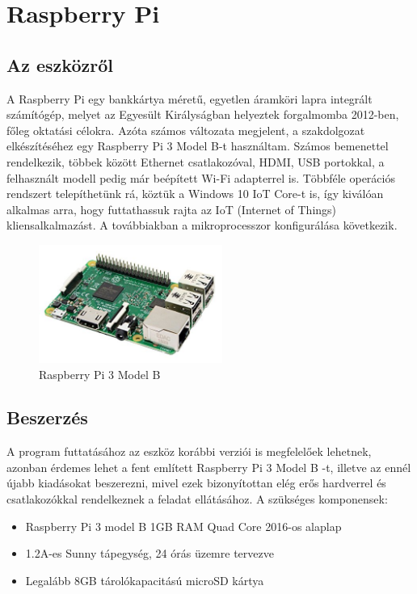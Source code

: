 \documentclass[a4paper,12pt]{report}
\begin{document}
    \section{Raspberry Pi}

    \subsection{Az eszközről}
    A Raspberry Pi egy bankkártya méretű, egyetlen áramköri lapra integrált számítógép, melyet az Egyesült Királyságban
    helyeztek forgalmomba 2012-ben, főleg oktatási célokra. Azóta számos változata megjelent, a szakdolgozat elkészítéséhez
    egy Raspberry Pi 3 Model B-t használtam. Számos bemenettel rendelkezik, többek között Ethernet csatlakozóval, HDMI, USB
    portokkal, a felhasznált modell pedig már beépített Wi-Fi adapterrel is. Többféle operációs rendszert telepíthetünk rá,
    köztük a Windows 10 IoT Core-t is, így kiválóan alkalmas arra, hogy futtathassuk rajta az IoT (Internet of Things) kliensalkalmazást.
    A továbbiakban a mikroprocesszor konfigurálása következik.\cite{WikiRaspberry}

    \begin{figure}[h!]
        \hspace{5cm}
        \includegraphics[width=6cm]{images/raspberry_pi3.jpg}
        \caption{Raspberry Pi 3 Model B}
        \label{fig: Raspberry Pi 3}
    \end{figure}

    \subsection{Beszerzés}
    A program futtatásához az eszköz korábbi verziói is megfelelőek lehetnek, azonban érdemes lehet a fent említett Raspberry Pi 3
    Model B -t, illetve az ennél újabb kiadásokat beszerezni, mivel ezek bizonyítottan elég erős hardverrel és csatlakozókkal rendelkeznek
    a feladat ellátásához. A szükséges komponensek:

    \begin{itemize}
        \item Raspberry Pi 3 model B 1GB RAM Quad Core 2016-os alaplap
        \item 1.2A-es Sunny tápegység, 24 órás üzemre tervezve
        \item Legalább 8GB tárolókapacitású microSD kártya
    \end{itemize}
\end{document}
